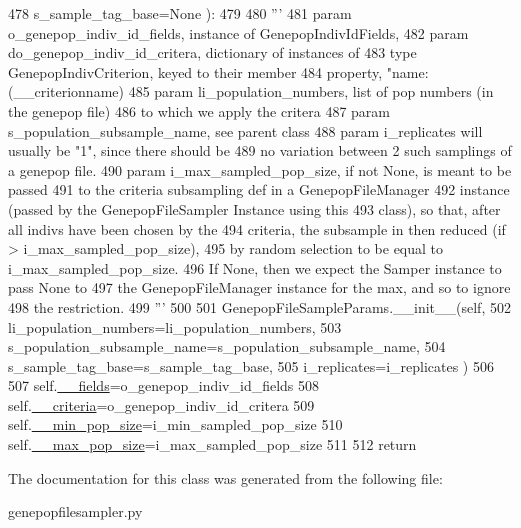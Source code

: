 \begin{DoxyCode}
478             s\_sample\_tag\_base=\textcolor{keywordtype}{None} ):
479 
480         \textcolor{stringliteral}{'''}
481 \textcolor{stringliteral}{        param o\_genepop\_indiv\_id\_fields, instance of GenepopIndivIdFields,}
482 \textcolor{stringliteral}{        param do\_genepop\_indiv\_id\_critera, dictionary of instances of }
483 \textcolor{stringliteral}{                type GenepopIndivCriterion, keyed to their member}
484 \textcolor{stringliteral}{                property, "name: (\_\_criterionname)}
485 \textcolor{stringliteral}{        param li\_population\_numbers, list of pop numbers (in the genepop file)}
486 \textcolor{stringliteral}{                to which we apply the critera}
487 \textcolor{stringliteral}{        param s\_population\_subsample\_name, see parent class}
488 \textcolor{stringliteral}{        param i\_replicates will usually be "1", since there should be}
489 \textcolor{stringliteral}{                no variation between 2 such samplings of a genepop file.}
490 \textcolor{stringliteral}{        param i\_max\_sampled\_pop\_size, if not None, is meant to be passed}
491 \textcolor{stringliteral}{            to the criteria subsampling def in a GenepopFileManager}
492 \textcolor{stringliteral}{            instance (passed by the GenepopFileSampler Instance using this}
493 \textcolor{stringliteral}{            class), so that, after all indivs have been chosen by the }
494 \textcolor{stringliteral}{            criteria, the subsample in then reduced (if > i\_max\_sampled\_pop\_size),}
495 \textcolor{stringliteral}{            by random selection to be equal to i\_max\_sampled\_pop\_size.}
496 \textcolor{stringliteral}{            If None, then we expect the Samper instance to pass None to }
497 \textcolor{stringliteral}{            the GenepopFileManager instance for the max, and so to ignore}
498 \textcolor{stringliteral}{            the restriction.}
499 \textcolor{stringliteral}{        '''}
500 
501         GenepopFileSampleParams.\_\_init\_\_(self, 
502                     li\_population\_numbers=li\_population\_numbers, 
503                     s\_population\_subsample\_name=s\_population\_subsample\_name,
504                     s\_sample\_tag\_base=s\_sample\_tag\_base,
505                     i\_replicates=i\_replicates )
506 
507         self.\hyperlink{classnegui_1_1genepopfilesampler_1_1GenepopFileSampleParamsCriteria_ad950159801c155f299d739072af9ff4c}{\_\_fields}=o\_genepop\_indiv\_id\_fields
508         self.\hyperlink{classnegui_1_1genepopfilesampler_1_1GenepopFileSampleParamsCriteria_ac11b68eab95e37c6e6cda61a8eab8da1}{\_\_criteria}=o\_genepop\_indiv\_id\_critera
509         self.\hyperlink{classnegui_1_1genepopfilesampler_1_1GenepopFileSampleParamsCriteria_a67b43f10ef8d60f9064976531103c984}{\_\_min\_pop\_size}=i\_min\_sampled\_pop\_size
510         self.\hyperlink{classnegui_1_1genepopfilesampler_1_1GenepopFileSampleParamsCriteria_a269ebb79749ca25df7e61f84760df79c}{\_\_max\_pop\_size}=i\_max\_sampled\_pop\_size
511 
512         \textcolor{keywordflow}{return}
\end{DoxyCode}


The documentation for this class was generated from the following file\+:\begin{DoxyCompactItemize}
\item 
genepopfilesampler.\+py\end{DoxyCompactItemize}
